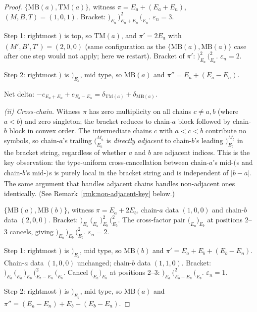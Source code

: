 \documentclass[11pt]{article}
\theoremstyle{definition}
\theoremstyle{remark}
\newcommand{\MB}{\mathrm{MB}}
\newcommand{\TM}{\mathrm{TM}}
\newcommand{\labr}[1]{{)}_{#1}}
\newcommand{\labl}[1]{{(}_{#1}}
\begin{document}
\begin{proof}
\smallskip
\noindent$\{\MB(a), \TM(a)\}$, witness $\pi = E_a + (E_a + E_n)$, $(M, B, T) = (1, 0, 1)$.
Bracket: $\labr{E_a}\, \labr{E_a + E_n}^{2}\, \labl{E_a}$. $\varepsilon_n = 3$.

Step 1: rightmost $\labr{}$ is top, so $\TM(a)$, and $\pi' = 2 E_a$ with
$(M', B', T') = (2, 0, 0)$ (same configuration as the $\{\MB(a), \MB(a)\}$ case
after one step would not apply; here we restart). Bracket of $\pi'$:
$\labr{E_a}^{2}\, \labl{E_a}^{2}$. $\varepsilon_n = 2$.

Step 2: rightmost $\labr{}$ is $\labr{E_a}$, mid type, so $\MB(a)$ and
$\pi'' = E_a + (E_a - E_n)$.

Net delta: $-e_{E_a + E_n} + e_{E_a - E_n} = \delta_{\TM(a)} + \delta_{\MB(a)}$.

\medskip
\noindent\textit{(ii) Cross-chain.} Witness $\pi$ has zero multiplicity on all
chains $c \neq a, b$ (where $a < b$) and zero singleton; the bracket reduces to
chain-$a$ block followed by chain-$b$ block in convex order. The intermediate
chains $c$ with $a < c < b$ contribute no symbols, so chain-$a$'s trailing
$\labl{E_a}^{M_a}$ is \emph{directly adjacent} to chain-$b$'s leading
$\labr{E_b}^{M_b}$ in the bracket string, regardless of whether $a$ and $b$ are
adjacent indices. This is the key observation: the type-uniform cross-cancellation
between chain-$a$'s mid-$\labl{}$s and chain-$b$'s mid-$\labr{}$s is purely local
in the bracket string and is independent of $|b - a|$. The same argument that
handles adjacent chains handles non-adjacent ones identically. (See
Remark~\ref{rmk:non-adjacent-key} below.)

\smallskip
\noindent$\{\MB(a), \MB(b)\}$, witness $\pi = E_a + 2 E_b$, chain-$a$ data
$(1, 0, 0)$ and chain-$b$ data $(2, 0, 0)$. Bracket: $\labr{E_a}\, \labl{E_a}\,
\labr{E_b}^{2}\, \labl{E_b}^{2}$. The cross-factor pair $\labl{E_a} \labr{E_b}$
at positions 2--3 cancels, giving $\labr{E_a}\, \labr{E_b}\, \labl{E_b}^{2}$.
$\varepsilon_n = 2$.

Step 1: rightmost $\labr{}$ is $\labr{E_b}$, mid type, so $\MB(b)$ and
$\pi' = E_a + E_b + (E_b - E_n)$. Chain-$a$ data $(1, 0, 0)$ unchanged; chain-$b$
data $(1, 1, 0)$. Bracket: $\labr{E_a}\, \labl{E_a}\, \labr{E_b}\, \labl{E_b - E_n}^{2}\,
\labl{E_b}$. Cancel $\labl{E_a}\labr{E_b}$ at positions 2--3:
$\labr{E_a}\, \labl{E_b - E_n}^{2}\, \labl{E_b}$. $\varepsilon_n = 1$.

Step 2: rightmost $\labr{}$ is $\labr{E_a}$, mid type, so $\MB(a)$ and
$\pi'' = (E_a - E_n) + E_b + (E_b - E_n)$.


\end{proof}
\end{document}
